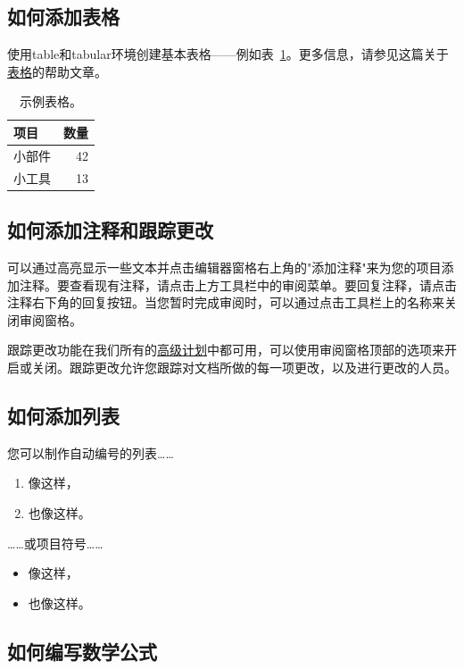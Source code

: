 \documentclass{article}
\begin{document}
\subsection{如何添加表格}

使用table和tabular环境创建基本表格——例如表~\ref{tab:widgets}。更多信息，请参见这篇关于\href{https://www.overleaf.com/learn/latex/tables}{表格}的帮助文章。

\begin{table}
\centering
\begin{tabular}{l|r}
项目 & 数量 \\\hline
小部件 & 42 \\
小工具 & 13
\end{tabular}
\caption{\label{tab:widgets}示例表格。}
\end{table}

\subsection{如何添加注释和跟踪更改}

可以通过高亮显示一些文本并点击编辑器窗格右上角的"添加注释"来为您的项目添加注释。要查看现有注释，请点击上方工具栏中的审阅菜单。要回复注释，请点击注释右下角的回复按钮。当您暂时完成审阅时，可以通过点击工具栏上的名称来关闭审阅窗格。

跟踪更改功能在我们所有的\href{https://www.overleaf.com/user/subscription/plans}{高级计划}中都可用，可以使用审阅窗格顶部的选项来开启或关闭。跟踪更改允许您跟踪对文档所做的每一项更改，以及进行更改的人员。

\subsection{如何添加列表}

您可以制作自动编号的列表……

\begin{enumerate}
\item 像这样，
\item 也像这样。
\end{enumerate}
……或项目符号……
\begin{itemize}
\item 像这样，
\item 也像这样。
\end{itemize}

\subsection{如何编写数学公式}
\end{document}
